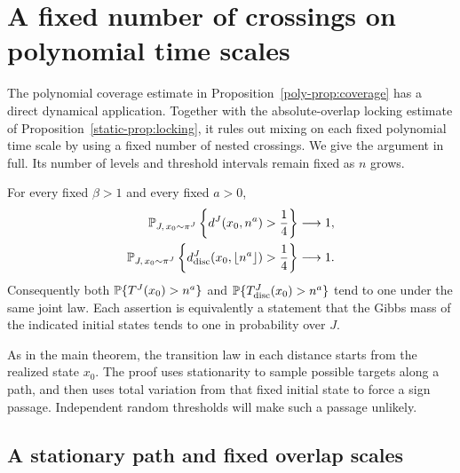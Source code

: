 \section{A fixed number of crossings on polynomial time scales}
\label{fixed-sec:crossings}

The polynomial coverage estimate in
Proposition~\ref{poly-prop:coverage} has a direct dynamical application.
Together with the absolute-overlap locking estimate of
Proposition~\ref{static-prop:locking}, it rules out mixing on each fixed
polynomial time scale by using a fixed number of nested crossings.
We give the argument in full. Its number of levels and threshold
intervals remain fixed as $n$ grows.

\begin{theorem}
\label{fixed-thm:polynomial}
For every fixed $\beta>1$ and every fixed $a>0$,
\begin{align}
 \mathbb P_{J,\,x_0\sim\pi^J}
 \left\{d^J(x_0,n^a)>\frac14\right\}&\longrightarrow1,
 \label{fixed-eq:continuous-conclusion}\\
 \mathbb P_{J,\,x_0\sim\pi^J}
 \left\{d_{\mathrm{disc}}^J(x_0,\lfloor n^a\rfloor)
                                      >\frac14\right\}
 &\longrightarrow1.
 \label{fixed-eq:discrete-conclusion}
\end{align}
Consequently both
$\mathbb P\{T^J(x_0)>n^a\}$ and
$\mathbb P\{T_{\mathrm{disc}}^J(x_0)>n^a\}$ tend to one under the same joint
law. Each assertion is equivalently a statement that the Gibbs mass of
the indicated initial states tends to one in probability over $J$.
\end{theorem}

As in the main theorem, the transition law in each distance starts from
the realized state $x_0$. The proof uses stationarity to sample possible
targets along a path, and then uses total variation from that fixed
initial state to force a sign passage. Independent random thresholds
will make such a passage unlikely.

\subsection{A stationary path and fixed overlap scales}
\label{fixed-subsec:path-scales}

